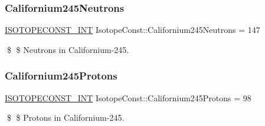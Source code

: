 \subsubsection{\texorpdfstring{Californium245\+Neutrons}{Californium245Neutrons}}
{\footnotesize\ttfamily \mbox{\hyperlink{group___isotope_const-_macros_ga5f18360b3e99483a35c32d789e62621c}{I\+S\+O\+T\+O\+P\+E\+C\+O\+N\+S\+T\+\_\+\+I\+NT}} Isotope\+Const\+::\+Californium245\+Neutrons = 147}

\$ \$ Neutrons in Californium-\/245. \mbox{\label{group___isotope_const-_californium-_cf245_gaaded657eb2514cdcb233bb6687cd7f00}} 
\subsubsection{\texorpdfstring{Californium245\+Protons}{Californium245Protons}}
{\footnotesize\ttfamily \mbox{\hyperlink{group___isotope_const-_macros_ga5f18360b3e99483a35c32d789e62621c}{I\+S\+O\+T\+O\+P\+E\+C\+O\+N\+S\+T\+\_\+\+I\+NT}} Isotope\+Const\+::\+Californium245\+Protons = 98}

\$ \$ Protons in Californium-\/245. 